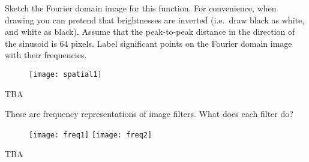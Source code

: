 \begin{blocksection}
\question Sketch the Fourier domain image for this function. For convenience, when drawing you can pretend that brightnesses are inverted (i.e.~draw black as white, and white as black). Assume that the peak-to-peak distance in the direction of the sinusoid is 64 pixels. Label significant points on the Fourier domain image with their frequencies.

\begin{figure}[H]
\centering
\texttt{[image: spatial1]}
\end{figure}

\vspace*{20mm}

\begin{solution}[0.75in]
{\color{red} TBA}
\end{solution}
\end{blocksection}


\begin{blocksection}
\question These are frequency representations of image filters. What does each filter do?

\begin{figure}[H]
\centering
\texttt{[image: freq1]} \hspace*{4mm} \texttt{[image: freq2]}
\end{figure}

\begin{solution}[0.75in]
{\color{red} TBA}
\end{solution}
\end{blocksection}
